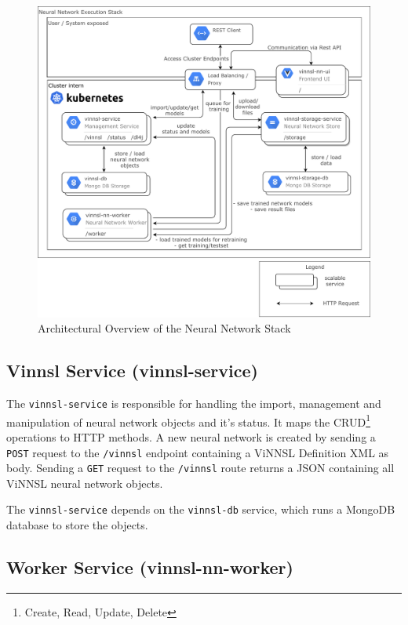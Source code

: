 \begin{figure}
\centering
\includegraphics[width=16.50000cm]{images/overview_nn_architecture}
\caption{Architectural Overview of the Neural Network
Stack\label{img.overview_nn_architecture}}
\end{figure}

\subsection{Vinnsl Service
(vinnsl-service)}\label{vinnsl-service-vinnsl-service}

The \texttt{vinnsl-service} is responsible for handling the import,
management and manipulation of neural network objects and it's status.
It maps the CRUD\footnote{Create, Read, Update, Delete} operations to
HTTP methods. A new neural network is created by sending a \texttt{POST}
request to the \texttt{/vinnsl} endpoint containing a ViNNSL Definition
XML as body. Sending a \texttt{GET} request to the \texttt{/vinnsl}
route returns a JSON containing all ViNNSL neural network objects.

The \texttt{vinnsl-service} depends on the \texttt{vinnsl-db} service,
which runs a MongoDB database to store the objects.

\subsection{Worker Service
(vinnsl-nn-worker)}\label{worker-service-vinnsl-nn-worker}


